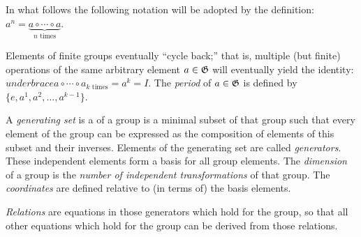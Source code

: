 In what follows the following notation will be adopted by the definition: $a^n = \underbrace{a \circ \cdots \circ a}_{n \text{ times}}$.

Elements of finite groups eventually ``cycle back;'' that is, multiple (but finite) operations of the same arbitrary element $a \in {\frak G}$ will eventually yield the identity:
$underbrace{a \circ \cdots \circ a}_{k \text{ times}}= a^k=I$.
The {\em period} of $a \in {\frak G}$ is defined by
$\{e,a^1,a^2,\ldots , a^{k-1}\}$.

A {\em generating set} is a
of a group is a minimal subset of that group such that every element of the group can be expressed as the composition of elements of this subset and their inverses.
Elements of the generating set are called {\em generators}.
These independent elements  form a basis for all group elements.
The {\em dimension} of a group is the {\em number of independent transformations} of that group.
The {\em coordinates} are defined relative to (in terms of) the basis elements.

{\em Relations}
 are equations in those generators which hold for the group, so that all other equations which hold for the group can be derived from those relations.






